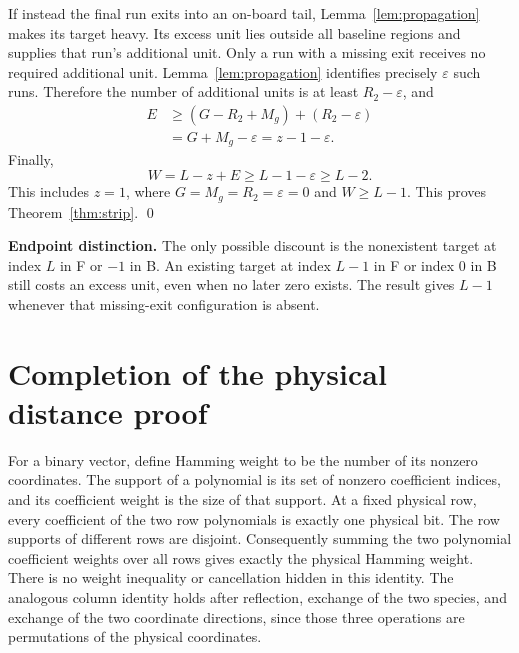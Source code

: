 \documentclass{article}
\begin{document}
If instead the final run exits into an on-board tail, Lemma~\ref{lem:propagation} makes its
target heavy. Its excess unit lies outside all baseline regions and supplies that run's
additional unit. Only a run with a missing exit receives no required additional unit.
Lemma~\ref{lem:propagation} identifies precisely \(\varepsilon\) such runs. Therefore the number
of additional units is at least \(R_2 - \varepsilon\), and
\begin{equation}
  \begin{aligned}
    E &\ge (G - R_2 + M_g) + (R_2 - \varepsilon) \\
      &= G + M_g - \varepsilon = z - 1 - \varepsilon.
  \end{aligned}
\end{equation}
Finally,
\begin{equation}
  W = L - z + E \ge L-1 - \varepsilon \ge L-2.
\end{equation}
This includes \(z = 1\), where \(G = M_g = R_2 = \varepsilon = 0\) and \(W \ge L-1\). This
proves Theorem~\ref{thm:strip}. \qed

\textbf{Endpoint distinction.} The only possible discount is the nonexistent target at index \(L\)
in F or \(-1\) in B. An existing target at index \(L-1\) in F or index 0 in B still costs an excess
unit, even when no later zero exists. The result gives \(L-1\) whenever that missing-exit
configuration is absent.


\section{Completion of the physical distance proof}\label{sec:completion}

For a binary vector, define Hamming weight to be the number of its nonzero
coordinates. The support of a polynomial is its set of nonzero coefficient
indices, and its coefficient weight is the size of that support. At a fixed
physical row, every coefficient of the two row polynomials is exactly one
physical bit. The row supports of different rows are disjoint. Consequently
summing the two polynomial coefficient weights over all rows gives exactly
the physical Hamming weight. There is no weight inequality or cancellation
hidden in this identity. The analogous column identity holds after reflection,
exchange of the two species, and exchange of the two coordinate directions,
since those three operations are permutations of the physical coordinates.
\end{document}
